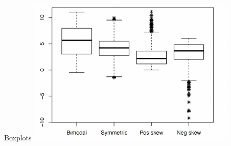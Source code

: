 \documentclass[12pt]{beamer}
\begin{document}
\begin{frame}{Boxplots}
	\centering
	\includegraphics[width=10cm]{box2.png}
\end{frame}
\end{document}
